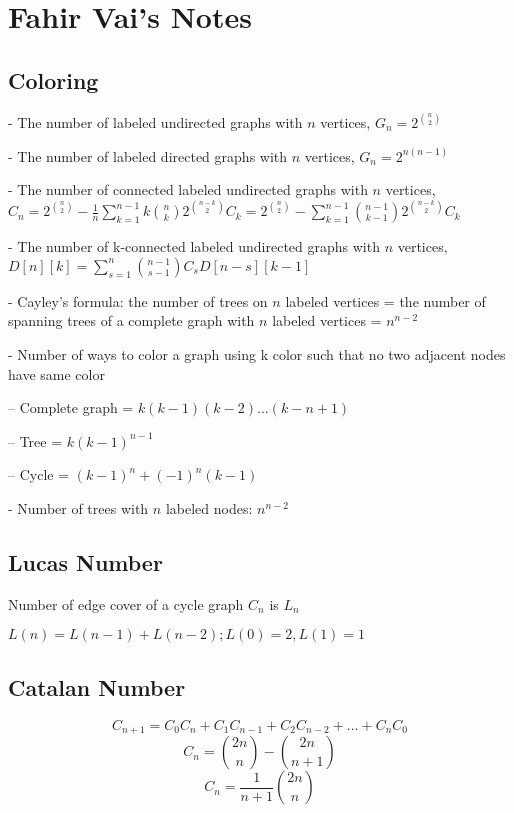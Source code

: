 \chapter{Fahir Vai's Notes}
\section{Coloring}

- The number of labeled undirected graphs with \( n \) vertices, \( G_n = 2^{\binom{n}{2}} \)

- The number of labeled directed graphs with \( n \) vertices, \( G_n = 2^{n(n - 1)} \)

- The number of connected labeled undirected graphs with \( n \) vertices, \( C_n = 2^{\binom{n}{2}} - \frac{1}{n} \sum_{k = 1}^{n - 1} k \binom{n}{k} 2^{\binom{n-k}{2}}C_k = 2^{\binom{n}{2}} - \sum_{k = 1}^{n - 1} \binom{n - 1}{k - 1} 2^{\binom{n-k}{2}}C_k \)

- The number of k-connected labeled undirected graphs with \( n \) vertices, \( D[n][k] = \sum_{s = 1}^{n} \binom{n - 1}{s- 1}C_s D[n - s][k - 1] \)

- Cayley's formula: the number of trees on \( n \) labeled vertices = the number of spanning trees of a complete graph with \( n \) labeled vertices = \( n^{n - 2} \)

- Number of ways to color a graph using k color such that no two adjacent nodes have same color

  -- Complete graph = \( k(k-1)(k-2)...(k-n+1) \)

  -- Tree = \( k(k - 1)^{n - 1} \)

  -- Cycle = \( (k - 1)^n + (-1)^n (k - 1) \)

- Number of trees with $ n $ labeled nodes: $ n^{n - 2} $

\section{Lucas Number}

Number of edge cover of a cycle graph $ C_n $ is $ L_n $

$ L(n) = L(n-1) + L(n-2); L(0)=2, L(1)=1 $

\section{Catalan Number}

\[ C_{n+1}= C_0C_n+C_1C_{n-1}+C_2C_{n-2}+... +C_nC_0 \]
\[ C_n = \binom{2n}{n} - \binom{2n}{n+1} \]
\[ C_n = \frac{1}{n + 1} \binom{2n}{n} \]

